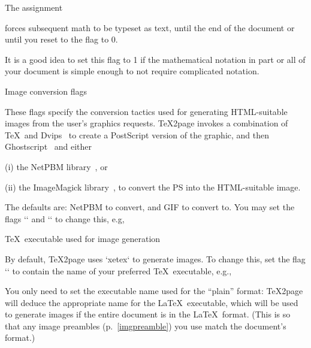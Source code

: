 The assignment

\begintt
\let\TZPmathtext=1
\endtt
%
forces subsequent math to be typeset as text, until the end of the document or
until you reset to the flag to 0.

It is a good idea to set this flag to 1 if the
mathematical notation in part or all of your document is simple enough to
not require complicated notation.

\beginsection Image conversion flags

%
These flags specify the conversion tactics used
for generating HTML-suitable images from the user’s graphics
requests.  \TeX2page invokes a combination of \TeX\ and
Dvips~\cite{dvips} to create a PostScript version of the
graphic, and then Ghostscript~\cite{gs} and either \item(i) the
NetPBM library~\cite{netpbm}, or \item(ii) the ImageMagick
library~\cite{imagemagick}, to convert the PS into the
HTML-suitable image.

The defaults are: NetPBM
to convert, and GIF to convert to.
You may set the flags `\TZPimageconverter` and `\TZPimageformat` to
change this, e.g,

\begintt
\def\TZPimageconverter{imagemagick}  %
\def\TZPimageconverter{netpbm}       %

\def\TZPimageformat{png}  %
\def\TZPimageformat{jpeg} %
\def\TZPimageformat{gif}  %
\endtt

\beginsection \TeX\ executable used for image generation

By default, \TeX2page uses `xetex` to
generate images. To change this, set the flag `\TZPtexprogname` to
contain the name of your preferred \TeX\ executable, e.g.,

\begintt
\def\TZPtexprogname{pdftex}
\endtt
%
You only need to set the executable name used for the “plain” format:
\TeX2page will deduce the appropriate name for the \LaTeX\ executable,
which will be used to generate images if the entire document is in the
\LaTeX\ format.  (This is so that any image preambles
(p.~\ref{imgpreamble}) you use match the
document’s format.)

